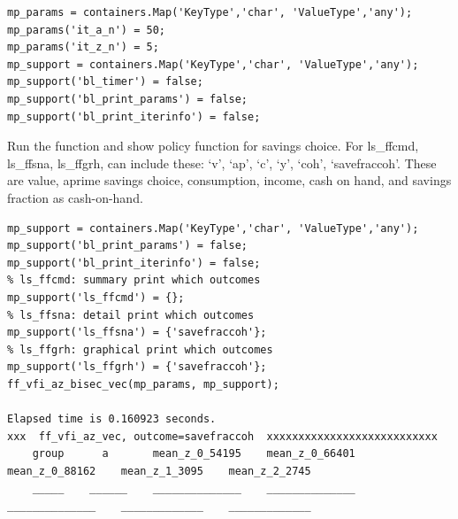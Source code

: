 \documentclass[
]{book}
\begin{document}
\begin{verbatim}
mp_params = containers.Map('KeyType','char', 'ValueType','any');
mp_params('it_a_n') = 50;
mp_params('it_z_n') = 5;
mp_support = containers.Map('KeyType','char', 'ValueType','any');
mp_support('bl_timer') = false;
mp_support('bl_print_params') = false;
mp_support('bl_print_iterinfo') = false;
\end{verbatim}

Run the function and show policy function for savings choice. For
ls\_ffcmd, ls\_ffsna, ls\_ffgrh, can include these: `v', `ap', `c', `y',
`coh', `savefraccoh'. These are value, aprime savings choice,
consumption, income, cash on hand, and savings fraction as cash-on-hand.

\begin{verbatim}
mp_support = containers.Map('KeyType','char', 'ValueType','any');
mp_support('bl_print_params') = false;
mp_support('bl_print_iterinfo') = false;
% ls_ffcmd: summary print which outcomes
mp_support('ls_ffcmd') = {};
% ls_ffsna: detail print which outcomes
mp_support('ls_ffsna') = {'savefraccoh'};
% ls_ffgrh: graphical print which outcomes
mp_support('ls_ffgrh') = {'savefraccoh'};
ff_vfi_az_bisec_vec(mp_params, mp_support);

Elapsed time is 0.160923 seconds.
xxx  ff_vfi_az_vec, outcome=savefraccoh  xxxxxxxxxxxxxxxxxxxxxxxxxxx
    group      a       mean_z_0_54195    mean_z_0_66401    mean_z_0_88162    mean_z_1_3095    mean_z_2_2745
    _____    ______    ______________    ______________    ______________    _____________    _____________


\end{verbatim}
\end{document}
